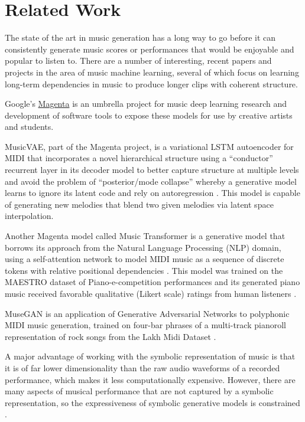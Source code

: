 \documentclass[sigconf,authorversion]{acmart}
\begin{document}
\section{Related Work}

The state of the art in music generation has a long way to go before
it can consistently generate music scores or performances that would
be enjoyable and popular to listen to. There are a number of
interesting, recent papers and projects in the area of music machine
learning, several of which focus on learning long-term dependencies in
music to produce longer clips with coherent structure.

Google's \href{https://magenta.tensorflow.org/}{Magenta} is an
umbrella project for music deep learning research and development of
software tools to expose these models for use by creative artists and
students.

MusicVAE, part of the Magenta project, is a variational LSTM
autoencoder for MIDI that incorporates a novel hierarchical structure
using a ``conductor'' recurrent layer in its decoder model to better
capture structure at multiple levels and avoid the problem of
``posterior/mode collapse'' whereby a generative model learns to
ignore its latent code and rely on autoregression
\cite{roberts_hierarchical_2018}. This model is capable of generating
new melodies that blend two given melodies via latent space
interpolation.


Another Magenta model called Music Transformer is a generative model
that borrows its approach from the Natural Language Processing (NLP)
domain, using a self-attention network to model MIDI music as a
sequence of discrete tokens with relative positional dependencies
\cite{huang_music_2018}. This model was trained on the MAESTRO dataset
of Piano-e-competition performances \cite{hawthorne2019enabling} and
its generated piano music received favorable qualitative (Likert
scale) ratings from human listeners \cite{huang_music_2018}.

MuseGAN \cite{dong2017musegan} is an application of Generative Adversarial
Networks to polyphonic MIDI music generation, trained on four-bar phrases of a
multi-track pianoroll representation of rock songs from the Lakh Midi Dataset
\cite{raffel_learning-based_2016}.

A major advantage of working with the symbolic representation of music is that
it is of far lower dimensionality than the raw audio waveforms of a recorded
performance, which makes it less computationally expensive. However, there are
many aspects of musical performance that are not captured by a symbolic
representation, so the expressiveness of symbolic generative models is
constrained \cite{manzelli_conditioning_2018}.
\end{document}
